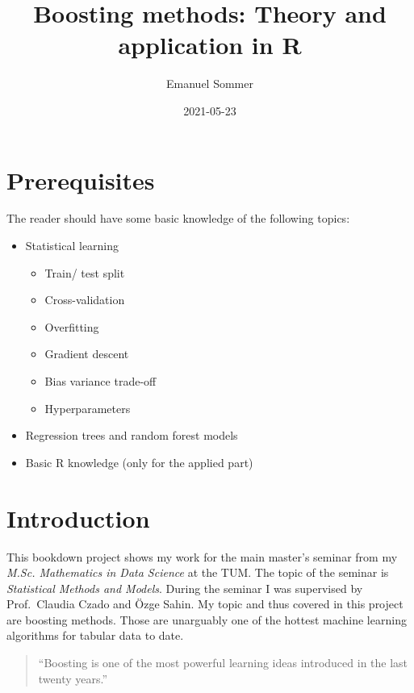 \documentclass[
]{book}
\title{Boosting methods: Theory and application in R}
\author{Emanuel Sommer}
\date{2021-05-23}
\begin{document}
\maketitle

{
\setcounter{tocdepth}{1}
\tableofcontents
}
\hypertarget{prerequisites}{%
\chapter{Prerequisites}\label{prerequisites}}

The reader should have some basic knowledge of the following topics:

\begin{itemize}
\item
  Statistical learning

  \begin{itemize}
  \item
    Train/ test split
  \item
    Cross-validation
  \item
    Overfitting
  \item
    Gradient descent
  \item
    Bias variance trade-off
  \item
    Hyperparameters
  \end{itemize}
\item
  Regression trees and random forest models
\item
  Basic R knowledge (only for the applied part)
\end{itemize}

\hypertarget{intro}{%
\chapter{Introduction}\label{intro}}

This bookdown project shows my work for the main master's seminar from my \emph{M.Sc. Mathematics in Data Science} at the TUM. The topic of the seminar is \emph{Statistical Methods and Models}. During the seminar I was supervised by Prof.~Claudia Czado and Özge Sahin. My topic and thus covered in this project are boosting methods. Those are unarguably one of the hottest machine learning algorithms for tabular data to date.

\begin{quote}
``Boosting is one of the most powerful learning ideas introduced in the last
twenty years.'' \citep{elements}
\end{quote}
\end{document}
